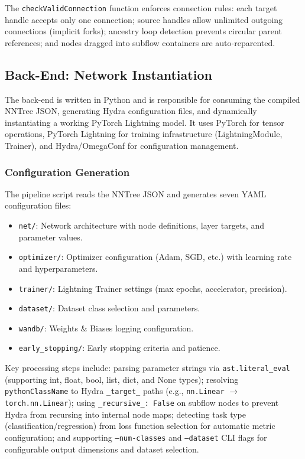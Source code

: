 \documentclass[11pt,a4paper]{article}
\begin{document}
The \texttt{checkValidConnection} function enforces connection rules: each target handle accepts only one connection; source handles allow unlimited outgoing connections (implicit forks); ancestry loop detection prevents circular parent references; and nodes dragged into subflow containers are auto-reparented.

\subsection{Back-End: Network Instantiation}

The back-end is written in Python and is responsible for consuming the compiled NNTree JSON, generating Hydra configuration files, and dynamically instantiating a working PyTorch Lightning model. It uses PyTorch for tensor operations, PyTorch Lightning for training infrastructure (LightningModule, Trainer), and Hydra/OmegaConf for configuration management.

\subsubsection{Configuration Generation}

The pipeline script reads the NNTree JSON and generates seven YAML configuration files:

\begin{itemize}
	\item \texttt{net/}: Network architecture with node definitions, layer targets, and parameter values.
	\item \texttt{optimizer/}: Optimizer configuration (Adam, SGD, etc.) with learning rate and hyperparameters.
	\item \texttt{trainer/}: Lightning Trainer settings (max epochs, accelerator, precision).
	\item \texttt{dataset/}: Dataset class selection and parameters.
	\item \texttt{wandb/}: Weights \& Biases logging configuration.
	\item \texttt{early\_stopping/}: Early stopping criteria and patience.
\end{itemize}

Key processing steps include: parsing parameter strings via \texttt{ast.literal\_eval} (supporting int, float, bool, list, dict, and None types); resolving \texttt{pythonClassName} to Hydra \texttt{\_target\_} paths (e.g., \texttt{nn.Linear} $\rightarrow$ \texttt{torch.nn.Linear}); using \texttt{\_recursive\_: False} on subflow nodes to prevent Hydra from recursing into internal node maps; detecting task type (classification/regression) from loss function selection for automatic metric configuration; and supporting \texttt{--num-classes} and \texttt{--dataset} CLI flags for configurable output dimensions and dataset selection.
\end{document}
